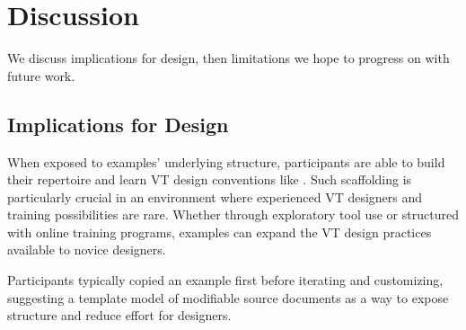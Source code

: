             
            
            





%
%
\section{Discussion}
We discuss implications for design, then limitations we hope to progress on with future work. %

\subsection{Implications for Design}
    
    When exposed to examples' underlying structure, participants are able to build their repertoire and learn VT design conventions like .
    Such scaffolding is particularly crucial in an environment where experienced VT designers and training possibilities are rare. %
    Whether through exploratory tool use or structured with online training programs, examples can expand the VT design practices available to novice designers.
    
    Participants typically copied an example first before iterating and customizing,
    suggesting a template model of modifiable source documents as a way to expose structure and reduce effort for designers.

